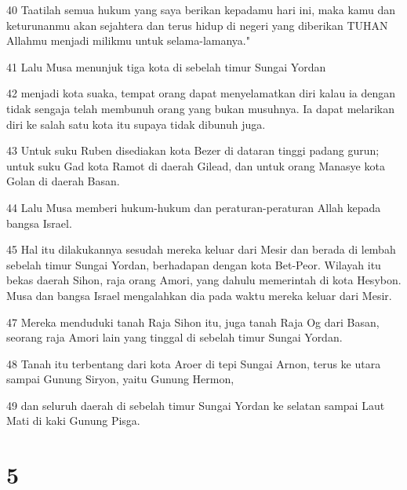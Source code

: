 \par 40 Taatilah semua hukum yang saya berikan kepadamu hari ini, maka kamu dan keturunanmu akan sejahtera dan terus hidup di negeri yang diberikan TUHAN Allahmu menjadi milikmu untuk selama-lamanya."
\par 41 Lalu Musa menunjuk tiga kota di sebelah timur Sungai Yordan
\par 42 menjadi kota suaka, tempat orang dapat menyelamatkan diri kalau ia dengan tidak sengaja telah membunuh orang yang bukan musuhnya. Ia dapat melarikan diri ke salah satu kota itu supaya tidak dibunuh juga.
\par 43 Untuk suku Ruben disediakan kota Bezer di dataran tinggi padang gurun; untuk suku Gad kota Ramot di daerah Gilead, dan untuk orang Manasye kota Golan di daerah Basan.
\par 44 Lalu Musa memberi hukum-hukum dan peraturan-peraturan Allah kepada bangsa Israel.
\par 45 Hal itu dilakukannya sesudah mereka keluar dari Mesir dan berada di lembah sebelah timur Sungai Yordan, berhadapan dengan kota Bet-Peor. Wilayah itu bekas daerah Sihon, raja orang Amori, yang dahulu memerintah di kota Hesybon. Musa dan bangsa Israel mengalahkan dia pada waktu mereka keluar dari Mesir.
\par 47 Mereka menduduki tanah Raja Sihon itu, juga tanah Raja Og dari Basan, seorang raja Amori lain yang tinggal di sebelah timur Sungai Yordan.
\par 48 Tanah itu terbentang dari kota Aroer di tepi Sungai Arnon, terus ke utara sampai Gunung Siryon, yaitu Gunung Hermon,
\par 49 dan seluruh daerah di sebelah timur Sungai Yordan ke selatan sampai Laut Mati di kaki Gunung Pisga.

\chapter{5}

